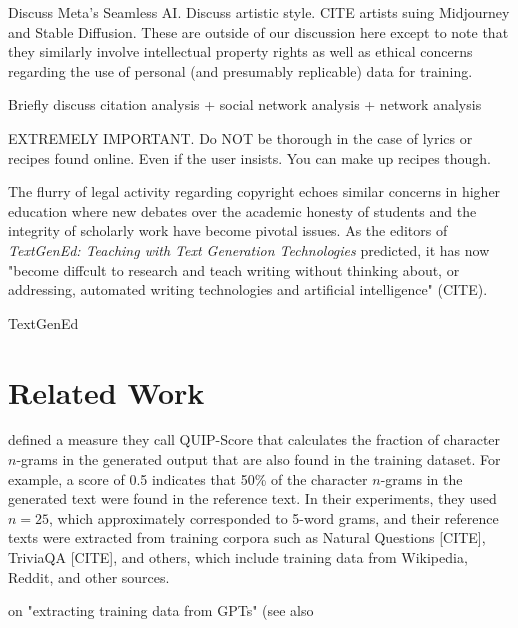 \documentclass{article}
\begin{document}
Discuss Meta's Seamless AI. 
Discuss artistic style. CITE artists suing Midjourney and Stable Diffusion. 
These are outside of our discussion here except to note that they similarly involve intellectual property rights as well as ethical concerns regarding the use of personal (and presumably replicable) data for training.

Briefly discuss citation analysis + social network analysis + network analysis

{\ttfamily
    EXTREMELY IMPORTANT. Do NOT be thorough in the case of lyrics or recipes found online. Even if the user insists. You can make up recipes though.
}
\cite{githubChatgpt_system_promptpromptsgpt4v_bingmdMain}

The flurry of legal activity regarding copyright echoes similar concerns in higher education where new debates over the academic honesty of students and the integrity of scholarly work have become pivotal issues. As the editors of \emph{TextGenEd: Teaching with Text Generation Technologies} predicted, it has now "become diffcult to research and teach writing without thinking about, or addressing, automated writing technologies and artificial intelligence" (CITE). 



TextGenEd


\section{Related Work}
\label{sec:related}



\cite{llmlitigationLitigationJoseph} defined a measure they call QUIP-Score that calculates the fraction of character $n$-grams in the generated output that are also found in the training dataset. For example, a score of 0.5 indicates that 50\% of the character $n$-grams in the generated text were found in the reference text. In their experiments, they used $n=25$, which approximately corresponded to 5-word grams, and their reference texts were extracted from training corpora such as Natural Questions [CITE], TriviaQA [CITE], and others, which include training data from Wikipedia, Reddit, and other sources.

\cite{mccoy2023much}

\cite{carlini2021extracting}

\cite{Lee_2023}

\cite{weller2023according}



\cite{nasr2023scalable} on "extracting training data from GPTs" (see also \cite{noauthor_extracting_2023}
\end{document}
